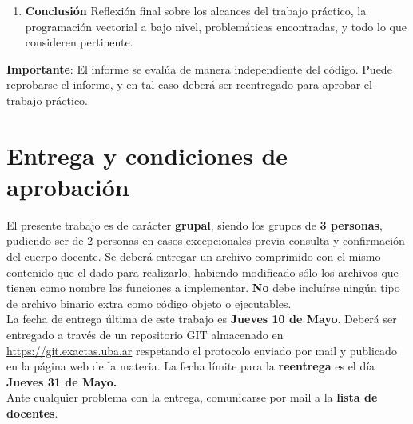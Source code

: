 \documentclass[a4paper, 12pt]{article}
\begin{document}
\begin{enumerate}
    \item
        \textbf{Conclusión}
        Reflexión final sobre los alcances del trabajo práctico,
        la programación vectorial a bajo nivel,
        problemáticas encontradas, y todo lo que consideren pertinente.
\end{enumerate}


\vspace*{0.3cm}
\textbf{Importante}: El informe se evalúa de manera independiente del
código.
Puede reprobarse el informe, y en tal caso deberá ser reentregado para
aprobar el trabajo práctico.



\section{Entrega y condiciones de aprobación}

El presente trabajo es de carácter \textbf{grupal}, siendo los grupos de
\textbf{3 personas}, pudiendo ser de 2 personas en casos excepcionales previa
consulta y confirmación del cuerpo docente. Se deberá entregar un archivo
comprimido con el mismo contenido que el dado para realizarlo, habiendo
modificado sólo los archivos que tienen como nombre las funciones a
implementar. \textbf{No} debe incluírse ningún tipo de archivo binario extra
como código objeto o ejecutables.\\


La fecha de entrega última de este trabajo es \textbf{Jueves 10 de Mayo}. Deberá ser entregado a través de un repositorio GIT almacenado en \url{https://git.exactas.uba.ar} respetando el protocolo enviado por mail y publicado en la página web de la materia.  La fecha límite para la \textbf{reentrega} es el día \textbf{Jueves 31 de Mayo.}\\

Ante cualquier problema con la entrega, comunicarse por
mail a la \textbf{lista de docentes}.\\
\end{document}
